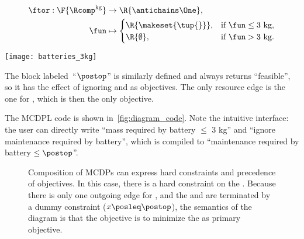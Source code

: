 \quad\quad
\begin{minipage}[c]{5cm}
    \begin{align*}
        \ftor:\F{\Rcomp^{\text{kg}}} & \rightarrow\R{\antichains\One}, \\
        \fun                         & \mapsto\begin{cases}
                                                  \R{\makeset{\tup{ } }}, & \text{if }\fun\leq\text{3 kg}, \\
                                                  \R{\emptyset},    & \text{if }\fun>\text{3 kg}.
                                              \end{cases}
    \end{align*}

\end{minipage}\quad\texttt{[image: batteries\_3kg]}

\smallskip{}

\noindent The block labeled~``$\postop$'' is similarly defined and always returns ``feasible'', so it has the effect of ignoring  and  as objectives.
The only resource edge is the one for , which is then the only objective.

The MCDPL code is shown in~\cref{fig:diagram_code}.
Note the intuitive interface: the user can directly write ``mass required by battery $\leq$ 3 kg'' and ``ignore maintenance required by battery'', which is compiled to ``maintenance required by battery $\leq\postop$''.

\begin{figure}
    \begin{centering}
    \end{centering}
    \begin{centering}
    \end{centering}
    \smallskip{}

    \caption{
        Composition of MCDPs can express hard constraints and precedence of objectives.
        In this case, there is a hard constraint on the .
        Because there is only one outgoing edge for , and the  and  are terminated by a dummy constraint ($x\posleq\postop$), the semantics of the diagram is that the objective is to minimize the  as primary objective.
    }
\end{figure}

